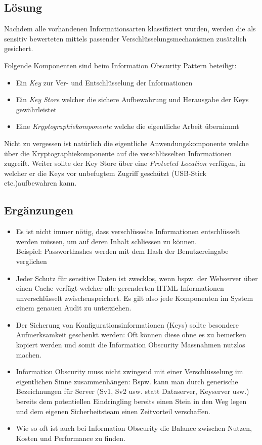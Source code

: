 \subsection*{Lösung}
Nachdem alle vorhandenen Informationsarten klassifiziert wurden, werden die als sensitiv bewerteten mittels passender Verschlüsselungsmechanismen zusätzlich gesichert.

Folgende Komponenten sind beim Information Obscurity Pattern beteiligt:

\begin{itemize}
	\item Ein \emph{Key} zur Ver- und Entschlüsselung der Informationen
	\item Ein \emph{Key Store} welcher die sichere Aufbewahrung und Herausgabe der Keys gewährleistet
	\item Eine \emph{Kryptographiekomponente} welche die eigentliche Arbeit übernimmt
\end{itemize}

Nicht zu vergessen ist natürlich die eigentliche Anwendungskomponente welche über die Kryptographiekomponente auf die verschlüsselten Informationen zugreift. Weiter sollte der Key Store über eine \emph{Protected Location} verfügen, in welcher er die Keys vor unbefugtem Zugriff geschützt (USB-Stick etc.)aufbewahren kann.

\subsection*{Ergänzungen}
\begin{itemize}
	\item Es ist nicht immer nötig, dass verschlüsselte Informationen entschlüsselt werden müssen, um auf deren Inhalt schliessen zu können.\\
	Beispiel: Passworthashes werden mit dem Hash der Benutzereingabe verglichen
	\item Jeder Schutz für sensitive Daten ist zwecklos, wenn bspw. der Webserver über einen Cache verfügt welcher alle gerenderten HTML-Informationen unverschlüsselt zwischenspeichert. Es gilt also jede Komponenten im System einem genauen Audit zu unterziehen.
	\item Der Sicherung von Konfigurationsinformationen (Keys) sollte besondere Aufmerksamkeit geschenkt werden: Oft können diese ohne es zu bemerken kopiert werden und somit die Information Obscurity Massnahmen nutzlos machen.
	\item Information Obscurity muss nicht zwingend mit einer Verschlüsselung im eigentlichen Sinne zusammenhängen: Bspw. kann man durch generische Bezeichnungen für Server (Sv1, Sv2 usw. statt Dataserver, Keyserver usw.) bereits dem potentiellen Eindringling bereits einen Stein in den Weg legen und dem eigenen Sicherheitsteam einen Zeitvorteil verschaffen.
	\item Wie so oft ist auch bei Information Obscurity die Balance zwischen Nutzen, Kosten und Performance zu finden.
\end{itemize}


